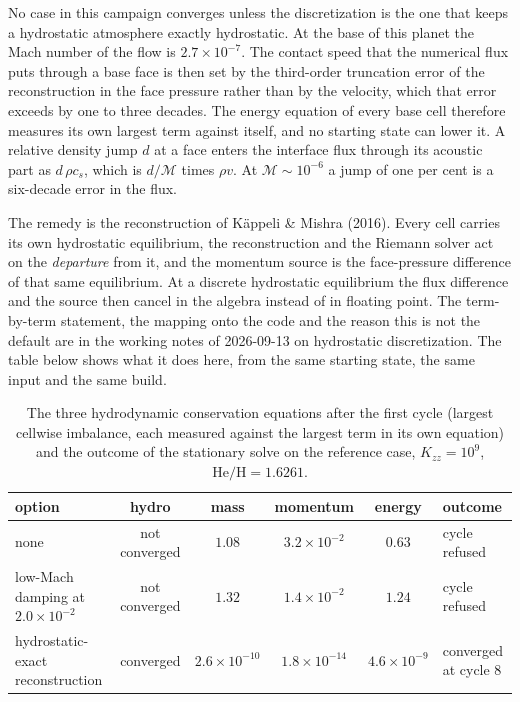 \documentclass[english,a4paper]{my_memo}
\begin{document}
No case in this campaign converges unless the discretization is the one that
keeps a hydrostatic atmosphere exactly hydrostatic. At the base of this
planet the Mach number of the flow is $2.7\times10^{-7}$. The contact speed
that the numerical flux puts through a base face is then set by the
third-order truncation error of the reconstruction in the face pressure
rather than by the velocity, which that error exceeds by one to three
decades. The energy equation of every base cell therefore measures its own
largest term against itself, and no starting state can lower it. A relative
density jump $d$ at a face enters the interface flux through its acoustic
part as $d\,\rho c_s$, which is $d/\mathcal{M}$ times $\rho v$. At
$\mathcal{M} \sim 10^{-6}$ a jump of one per cent is a six-decade error in
the flux.

The remedy is the reconstruction of K\"appeli \& Mishra (2016). Every cell
carries its own hydrostatic equilibrium, the reconstruction and the Riemann
solver act on the \emph{departure} from it, and the momentum source is the
face-pressure difference of that same equilibrium. At a discrete hydrostatic
equilibrium the flux difference and the source then cancel in the algebra
instead of in floating point. The term-by-term statement, the mapping onto
the code and the reason this is not the default are in the working notes of
2026-09-13 on hydrostatic discretization. The table below shows what it does
here, from the same starting state, the same input and the same build.

\begin{table}[h]
\centering
\caption{The three hydrodynamic conservation equations after the first cycle
(largest cellwise imbalance, each measured against the largest term in its
own equation) and the outcome of the stationary solve on the reference case,
$K_{zz} = 10^{9}$, $\mathrm{He/H} = 1.6261$.}
\setlength{\tabcolsep}{5.5pt}
\begin{tabular}{lccccl}
\toprule
option & hydro & mass & momentum & energy & outcome \\
\midrule
none & not converged & $1.08$ & $3.2\times10^{-2}$ & $0.63$ & cycle refused \\
low-Mach damping at $2.0\times10^{-2}$ & not converged & $1.32$ & $1.4\times10^{-2}$ & $1.24$ & cycle refused \\
hydrostatic-exact reconstruction & converged & $2.6\times10^{-10}$ & $1.8\times10^{-14}$ & $4.6\times10^{-9}$ & converged at cycle 8 \\
\bottomrule
\end{tabular}
\end{table}
\end{document}
